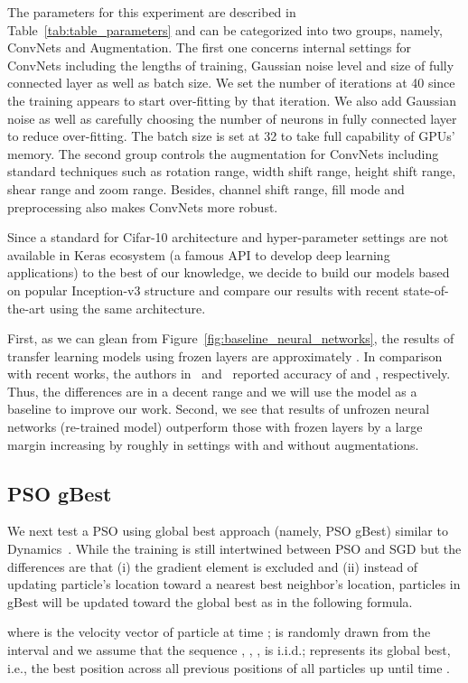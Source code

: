 \documentclass{ieeeaccess}
\begin{document}
The parameters for this experiment are described in Table~\ref{tab:table_parameters} and can be categorized into two groups, namely, ConvNets and Augmentation. The first one concerns internal settings for ConvNets including the lengths of training, Gaussian noise level and size of fully connected layer as well as batch size. We set the number of iterations at 40 since the training appears to start over-fitting by that iteration. We also add Gaussian noise as well as carefully choosing the number of neurons in fully connected layer to reduce over-fitting. The batch size is set at 32 to take full capability of GPUs' memory. The second group controls the augmentation for ConvNets including standard techniques such as rotation range, width shift range, height shift range, shear range and zoom range. Besides, channel shift range, fill mode and preprocessing also makes ConvNets more robust.

Since a standard for Cifar-10 architecture and hyper-parameter settings are not available in Keras ecosystem (a famous API to develop deep learning applications) to the best of our knowledge, we decide to build our models based on popular Inception-v3 structure and compare our results with recent state-of-the-art using the same architecture. 

First, as we can glean from Figure~\ref{fig:baseline_neural_networks}, the results of transfer learning models using frozen layers are approximately . In comparison with recent works, the authors in~\cite{alkhouly2021improving} and~\cite{kalayeh2019training} reported accuracy of  and , respectively. Thus, the differences are in a decent range and we will use the model as a baseline to improve our work. Second, we see that results of unfrozen neural networks (re-trained model) outperform those with frozen layers by a large margin increasing by roughly  in settings with and without augmentations.
\subsection{PSO gBest}
\label{sec:psobaseline}
We next test a PSO using global best approach (namely, PSO gBest) similar to Dynamics~. While the training is still intertwined between PSO and SGD but the differences are that (i) the gradient element is excluded and (ii) instead of updating particle's location toward a nearest best neighbor's location, particles in gBest will be updated toward the global best as in the following formula.

where  is the velocity vector of particle  at time ;  is randomly drawn from the interval  and we assume that the sequence , , ,  is i.i.d.;  represents its global best, i.e., the best position across all previous positions of all particles up until time .
\end{document}
